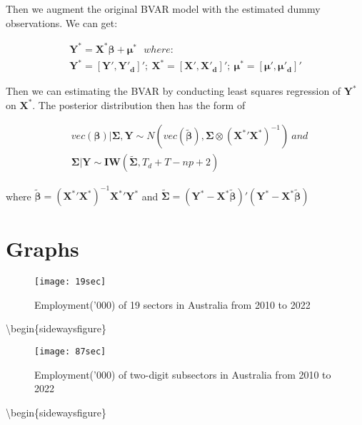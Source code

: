 \documentclass{monashthesis}
\begin{document}
Then we augment the original BVAR model with the estimated dummy observations. We can get:

\[
\begin{aligned}
\bm{Y^*}=\bm{X^*}\bm{\beta}+\bm{\mu}^*\ \ \  where: \\
\bm{Y^*}=[\bm{Y'},\bm{Y'_d}]';\ \bm{X^*}=[\bm{X'},\bm{X'_d}]';\ \bm{\mu^*}=[\bm{\mu'},\bm{\mu'_d}]'
\end{aligned}
\]

Then we can estimating the BVAR by conducting least squares regression of \(\boldsymbol{Y}^*\) on \(\boldsymbol{X}^*\). The posterior distribution then has the form of

\[
\begin{aligned}
&vec(\bm{\beta})|\bm{\Sigma},\bm{Y}\sim N(vec(\boldsymbol{\tilde\beta}),\boldsymbol{\Sigma}\otimes(\boldsymbol{X^*}'\boldsymbol{X^*})^{-1})\ and\\
&\bm{\Sigma}|\bm{Y}\sim\bm{IW}(\bm{\tilde\Sigma},T_d+T-np+2)
\end{aligned}
\]

where \(\bm{\tilde\beta} =({\bm{X^{*}}}'\bm{X^{*}})^{-1} {\bm{X^{*}}}'\bm{Y^{*}}\) and \(\bm{\tilde\Sigma}=(\bm{Y^{*}}-\bm{X^{*}}\bm{\tilde\beta})'(\bm{Y^{*}}-\bm{X^{*}}\bm{\tilde\beta})\)

\newpage

\hypertarget{graphs}{%
\chapter{Graphs}\label{graphs}}

\graphicspath{ {/Users/elvisyang/Desktop/hon_proj/Disaggregated_Employment/Honours_thesis/figures} }

\begin{figure}[t]
\texttt{[image: 19sec]}
\centering
\caption{Employment('000) of 19 sectors in Australia from 2010 to 2022}
\label{fig:19}
\end{figure}

\textbackslash begin\{sidewaysfigure\}

\begin{figure}[t]
\texttt{[image: 87sec]}
\centering
\caption{Employment('000) of two-digit subsectors in Australia from 2010 to 2022}
\label{fig:86}
\end{figure}

\textbackslash begin\{sidewaysfigure\}
\end{document}
